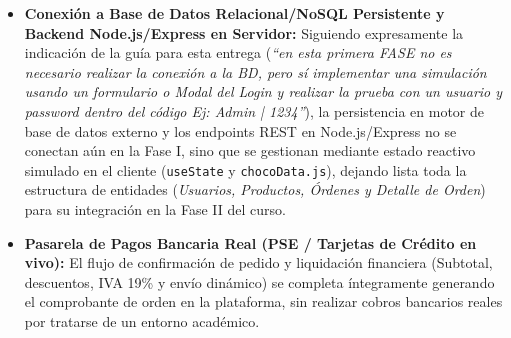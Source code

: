\documentclass[12pt,letterpaper]{article}
\begin{document}
\begin{itemize}[leftmargin=1.2cm]
  \item \textbf{Conexión a Base de Datos Relacional/NoSQL Persistente y Backend Node.js/Express en Servidor:}
    Siguiendo expresamente la indicación de la guía para esta entrega (\textit{``en esta primera FASE no es necesario realizar la conexión a la BD, pero sí implementar una simulación usando un formulario o Modal del Login y realizar la prueba con un usuario y password dentro del código Ej: Admin | 1234''}), la persistencia en motor de base de datos externo y los endpoints REST en Node.js/Express no se conectan aún en la Fase I, sino que se gestionan mediante estado reactivo simulado en el cliente (\texttt{useState} y \texttt{chocoData.js}), dejando lista toda la estructura de entidades (\textit{Usuarios, Productos, Órdenes y Detalle de Orden}) para su integración en la Fase II del curso.
  \item \textbf{Pasarela de Pagos Bancaria Real (PSE / Tarjetas de Crédito en vivo):}
    El flujo de confirmación de pedido y liquidación financiera (Subtotal, descuentos, IVA 19\% y envío dinámico) se completa íntegramente generando el comprobante de orden en la plataforma, sin realizar cobros bancarios reales por tratarse de un entorno académico.
\end{itemize}
\end{document}
